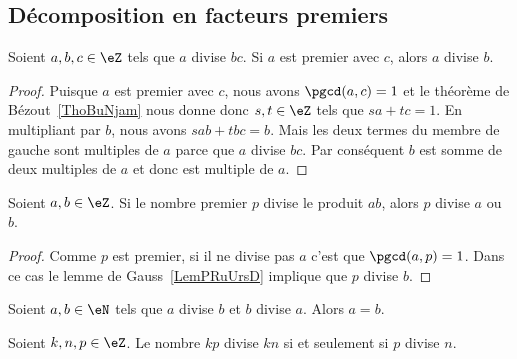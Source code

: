 \subsection{Décomposition en facteurs premiers}

\begin{lemma}    \label{LemPRuUrsD}
	Soient \( a,b,c\in \eZ\) tels que \( a\) divise \( bc\). Si \( a\) est premier avec \( c\), alors \( a\) divise \( b\).
\end{lemma}

\begin{proof}
	Puisque \( a\) est premier avec \( c\), nous avons \( \pgcd(a,c)=1\) et le théorème de Bézout~\ref{ThoBuNjam} nous donne donc \( s,t\in \eZ\) tels que \( sa+tc=1\). En multipliant par \( b\), nous avons \( sab+tbc=b\). Mais les deux termes du membre de gauche sont multiples de \( a\) parce que \( a\) divise \( bc\). Par conséquent \( b\) est somme de deux multiples de \( a\) et donc est multiple de \( a\).
\end{proof}

\begin{lemma}       \label{LemAXINooOeuMJZ}
	Soient \( a,b\in \eZ\). Si le nombre premier \( p\) divise le produit \( ab\), alors \( p\) divise \( a\) ou \( b\).
\end{lemma}

\begin{proof}
	Comme \( p\) est premier, si il ne divise pas \( a\) c'est que \( \pgcd(a,p)=1\). Dans ce cas le lemme de Gauss~\ref{LemPRuUrsD} implique que \( p\) divise \( b\).
\end{proof}

\begin{lemma}		\label{LEMooSRFMooHgEMwj}
	Soient \( a,b\in \eN\) tels que \( a\) divise \( b\) et \( b\) divise \( a\). Alors \( a=b\).
\end{lemma}

\begin{lemma}	\label{LEMooFVSJooRysGAm}
	Soient \( k,n,p\in \eZ\). Le nombre \( kp\) divise \( kn\) si et seulement si \( p\) divise \( n\).
\end{lemma}

